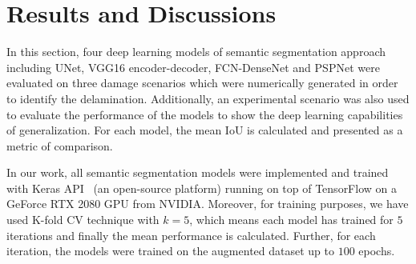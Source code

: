 \section{Results and Discussions}
In this section, four deep learning models  of semantic segmentation approach including UNet, VGG16 encoder-decoder, FCN-DenseNet and PSPNet were evaluated on three damage scenarios  which were numerically generated in order to identify the delamination.
Additionally, an experimental scenario was also used to evaluate the performance of the models to show the deep learning capabilities of generalization.
For each model, the mean IoU is calculated and presented as a metric of comparison.

In our work, all semantic segmentation models were implemented and trained with Keras API~\cite{chollet2015keras} (an open-source platform) running on top of TensorFlow on a GeForce RTX 2080 GPU from NVIDIA. 
Moreover, for training purposes, we have used K-fold CV technique with \(k=5\), which means each model has trained for \(5\) iterations and finally the mean performance is calculated. 
Further, for each iteration, the models were trained on the augmented dataset up to \(100\) epochs.

